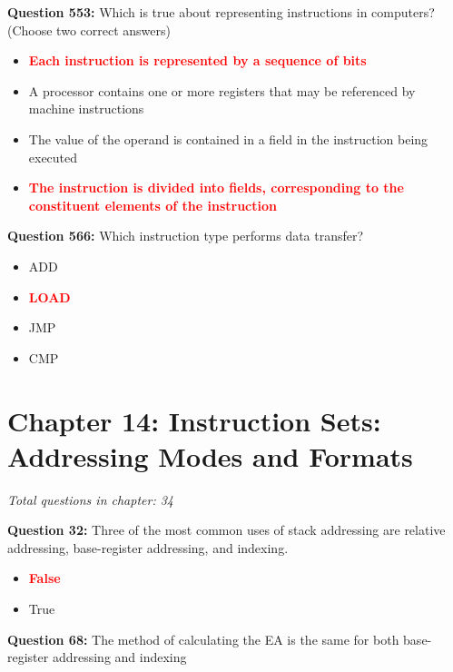 \documentclass[12pt,a4paper]{article}
\begin{document}
\textbf{Question 553:} Which is true about representing instructions in computers? (Choose two correct answers)

\begin{itemize}
    \item[\textbf{A.}] \textcolor{red}{\textbf{Each instruction is represented by a sequence of bits}}
    \item[\textbf{B.}] A processor contains one or more registers that may be referenced by machine instructions
    \item[\textbf{C.}] The value of the operand is contained in a field in the instruction being executed
    \item[\textbf{D.}] \textcolor{red}{\textbf{The instruction is divided into fields, corresponding to the constituent elements of the instruction}}
\end{itemize}

\textbf{Question 566:} Which instruction type performs data transfer?

\begin{itemize}
    \item[\textbf{A.}] ADD
    \item[\textbf{B.}] \textcolor{red}{\textbf{LOAD}}
    \item[\textbf{C.}] JMP
    \item[\textbf{D.}] CMP
\end{itemize}

\section{Chapter 14: Instruction Sets: Addressing Modes and Formats}
\textit{Total questions in chapter: 34}

\textbf{Question 32:} Three of the most common uses of stack addressing are relative addressing, base-register addressing, and indexing.

\begin{itemize}
    \item[\textbf{A.}] \textcolor{red}{\textbf{False}}
    \item[\textbf{B.}] True
\end{itemize}

\vspace{0.5cm}

\vspace{0.5cm}

\textbf{Question 68:} The method of calculating the EA is the same for both base-register addressing and indexing
\end{document}
